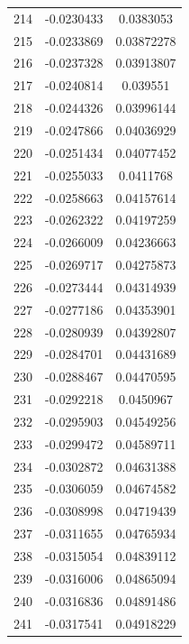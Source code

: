 \documentclass[a4paper, 11pt, oneside]{report}
\begin{document}
{\begin{longtable}{|c|c|c|}
214 & -0.0230433 & 0.0383053  \\
215 & -0.0233869 & 0.03872278 \\
216 & -0.0237328 & 0.03913807 \\
217 & -0.0240814 & 0.039551   \\
218 & -0.0244326 & 0.03996144 \\
219 & -0.0247866 & 0.04036929 \\
220 & -0.0251434 & 0.04077452 \\
221 & -0.0255033 & 0.0411768  \\
222 & -0.0258663 & 0.04157614 \\
223 & -0.0262322 & 0.04197259 \\
224 & -0.0266009 & 0.04236663 \\
225 & -0.0269717 & 0.04275873 \\
226 & -0.0273444 & 0.04314939 \\
227 & -0.0277186 & 0.04353901 \\
228 & -0.0280939 & 0.04392807 \\
229 & -0.0284701 & 0.04431689 \\
230 & -0.0288467 & 0.04470595 \\
231 & -0.0292218 & 0.0450967  \\
232 & -0.0295903 & 0.04549256 \\
233 & -0.0299472 & 0.04589711 \\
234 & -0.0302872 & 0.04631388 \\
235 & -0.0306059 & 0.04674582 \\
236 & -0.0308998 & 0.04719439 \\
237 & -0.0311655 & 0.04765934 \\
238 & -0.0315054 & 0.04839112 \\
239 & -0.0316006 & 0.04865094 \\
240 & -0.0316836 & 0.04891486 \\
241 & -0.0317541 & 0.04918229 \\
\hline
\end{longtable}
\unskip
\unpenalty
\unpenalty}

\begin{multicols}{2}
\unvbox\ltmcbox
\end{multicols}
\end{document}
